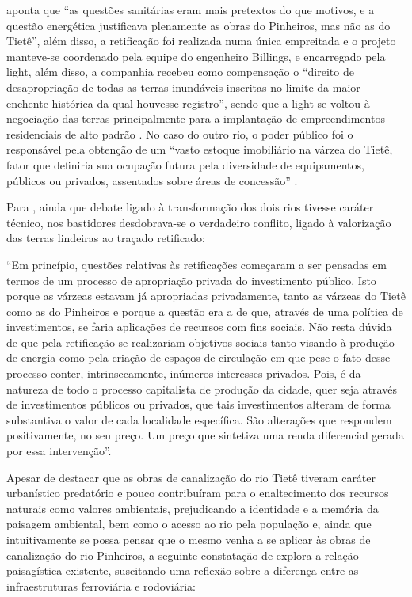 \documentclass[
article,			%
11pt,				%
oneside,			%
a4paper,			%
english,			%
brazil,				%
sumario=tradicional
]{abntex2}
\begin{document}
	 aponta que ``as questões sanitárias eram mais pretextos do que motivos, e a questão energética justificava plenamente as obras do Pinheiros, mas não as do Tietê'', além disso, a retificação foi realizada numa única empreitada e o projeto manteve-se coordenado pela equipe do engenheiro Billings, \cite[p. 58]{franco2005a} e encarregado pela \glsdesc{light}, além disso, a companhia recebeu como compensação o ``direito de desapropriação de todas as terras inundáveis inscritas no limite da maior enchente histórica da qual houvesse registro''\cite[p. 59]{franco2005a}, sendo que a \gls{light} se voltou à negociação das terras principalmente para a implantação de empreendimentos residenciais de alto padrão \cite[p. 55]{franco2005a}. No caso do outro rio, o poder público foi o responsável pela obtenção de um ``vasto estoque imobiliário na várzea do Tietê, fator que definiria sua ocupação futura pela diversidade de equipamentos, públicos ou privados, assentados sobre áreas de concessão'' \cite[p. 55]{franco2005a}.
	
	Para , ainda que debate ligado à transformação dos dois rios tivesse caráter técnico, nos bastidores desdobrava-se o verdadeiro conflito, ligado à valorização das terras lindeiras ao traçado retificado:
	
	\begin{citacao}
		``Em princípio, questões relativas às retificações começaram a ser pensadas em termos de um processo de apropriação privada do investimento público. Isto porque as várzeas estavam já apropriadas privadamente, tanto as várzeas do Tietê como as do Pinheiros e porque a questão era a de que, através de uma política de investimentos, se faria aplicações de recursos com fins sociais. Não resta dúvida de que pela retificação se realizariam objetivos sociais tanto visando à produção de energia como pela criação de espaços de circulação em que pese o fato desse processo conter, intrinsecamente, inúmeros interesses privados. Pois, é da natureza de todo o processo capitalista de produção da cidade, quer seja através de investimentos públicos ou privados, que tais investimentos alteram de forma substantiva o valor de cada localidade específica. São alterações que respondem positivamente, no seu preço. Um preço que sintetiza uma renda diferencial gerada por essa intervenção''.
	\end{citacao}
	
	Apesar de  destacar que as obras de canalização do rio Tietê tiveram caráter urbanístico predatório e pouco contribuíram para o enaltecimento dos recursos naturais como valores ambientais, prejudicando a identidade e a memória da paisagem ambiental, bem como o acesso ao rio pela população e, ainda que intuitivamente se possa pensar que o mesmo venha a se aplicar às obras de canalização do rio Pinheiros, a seguinte constatação de  explora a relação paisagística existente, suscitando uma reflexão sobre a diferença entre as infraestruturas ferroviária e rodoviária:
	
\end{document}
